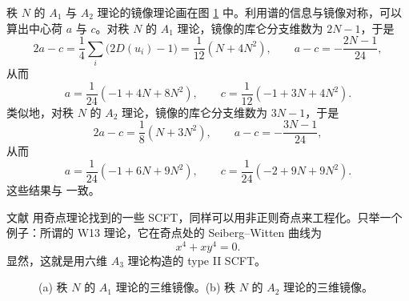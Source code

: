 秩 $N$ 的 $A_1$ 与 $A_2$ 理论的镜像理论画在图 \ref{fig:20} 中。利用谱的信息与镜像对称，可以算出中心荷 $a$ 与 $c$。对秩 $N$ 的 $A_1$ 理论，镜像的库仑分支维数为 $2N-1$，于是
\begin{equation}
2a-c = \frac{1}{4}\sum_i\bigl(2D(u_i)-1\bigr) = \frac{1}{12}(N+4N^2),\qquad
a-c = -\frac{2N-1}{24},
\label{eq:7.4}\tag{7.4}
\end{equation}
从而
\begin{equation}
a = \frac{1}{24}(-1+4N+8N^2),\qquad c = \frac{1}{12}(-1+3N+4N^2).
\label{eq:7.5}\tag{7.5}
\end{equation}
类似地，对秩 $N$ 的 $A_2$ 理论，镜像的库仑分支维数为 $3N-1$，于是
\begin{equation}
2a-c = \frac{1}{8}(N+3N^2),\qquad a-c = -\frac{3N-1}{24},
\label{eq:7.6}\tag{7.6}
\end{equation}
从而
\begin{equation}
a = \frac{1}{24}(-1+6N+9N^2),\qquad c = \frac{1}{24}(-2+9N+9N^2).
\label{eq:7.7}\tag{7.7}
\end{equation}
这些结果与 \cite{21} 一致。

文献 \cite{47,48} 用奇点理论找到的一些 SCFT，同样可以用非正则奇点来工程化。只举一个例子：所谓的 W13 理论，它在奇点处的 Seiberg--Witten 曲线为
\begin{equation}
x^4 + x y^4 = 0 .
\label{eq:7.8}\tag{7.8}
\end{equation}
显然，这就是用六维 $A_3$ 理论构造的 type II SCFT。

\begin{figure}[tbp]
\centering

\caption{(a) 秩 $N$ 的 $A_1$ 理论的三维镜像。(b) 秩 $N$ 的 $A_2$ 理论的三维镜像。}
\label{fig:20}
\end{figure}
